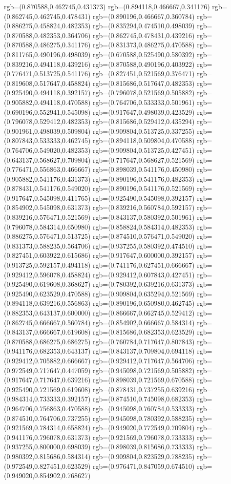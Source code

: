{{rgb=(0.870588,0.462745,0.431373)
rgb=(0.894118,0.466667,0.341176)
rgb=(0.862745,0.462745,0.478431)
rgb=(0.890196,0.466667,0.360784)
rgb=(0.886275,0.458824,0.482353)
rgb=(0.835294,0.474510,0.498039)
rgb=(0.870588,0.482353,0.364706)
rgb=(0.862745,0.478431,0.439216)
rgb=(0.870588,0.486275,0.341176)
rgb=(0.831373,0.486275,0.470588)
rgb=(0.811765,0.490196,0.498039)
rgb=(0.670588,0.525490,0.580392)
rgb=(0.839216,0.494118,0.439216)
rgb=(0.870588,0.490196,0.403922)
rgb=(0.776471,0.513725,0.541176)
rgb=(0.827451,0.521569,0.376471)
rgb=(0.819608,0.517647,0.458824)
rgb=(0.815686,0.517647,0.482353)
rgb=(0.925490,0.494118,0.392157)
rgb=(0.796078,0.521569,0.505882)
rgb=(0.905882,0.494118,0.470588)
rgb=(0.764706,0.533333,0.501961)
rgb=(0.690196,0.552941,0.545098)
rgb=(0.917647,0.498039,0.423529)
rgb=(0.796078,0.529412,0.482353)
rgb=(0.815686,0.529412,0.435294)
rgb=(0.901961,0.498039,0.509804)
rgb=(0.909804,0.513725,0.337255)
rgb=(0.807843,0.533333,0.462745)
rgb=(0.894118,0.509804,0.470588)
rgb=(0.764706,0.549020,0.482353)
rgb=(0.909804,0.513725,0.427451)
rgb=(0.643137,0.568627,0.709804)
rgb=(0.717647,0.568627,0.521569)
rgb=(0.776471,0.556863,0.466667)
rgb=(0.898039,0.541176,0.450980)
rgb=(0.905882,0.541176,0.431373)
rgb=(0.890196,0.541176,0.482353)
rgb=(0.878431,0.541176,0.549020)
rgb=(0.890196,0.541176,0.521569)
rgb=(0.917647,0.545098,0.411765)
rgb=(0.925490,0.545098,0.392157)
rgb=(0.854902,0.545098,0.631373)
rgb=(0.839216,0.560784,0.592157)
rgb=(0.839216,0.576471,0.521569)
rgb=(0.843137,0.580392,0.501961)
rgb=(0.796078,0.584314,0.650980)
rgb=(0.858824,0.584314,0.482353)
rgb=(0.886275,0.576471,0.513725)
rgb=(0.874510,0.576471,0.549020)
rgb=(0.831373,0.588235,0.564706)
rgb=(0.937255,0.580392,0.474510)
rgb=(0.827451,0.603922,0.615686)
rgb=(0.917647,0.600000,0.392157)
rgb=(0.913725,0.592157,0.494118)
rgb=(0.741176,0.627451,0.666667)
rgb=(0.929412,0.596078,0.458824)
rgb=(0.929412,0.607843,0.427451)
rgb=(0.925490,0.619608,0.368627)
rgb=(0.780392,0.639216,0.631373)
rgb=(0.925490,0.623529,0.470588)
rgb=(0.909804,0.635294,0.521569)
rgb=(0.894118,0.639216,0.556863)
rgb=(0.890196,0.650980,0.462745)
rgb=(0.882353,0.643137,0.600000)
rgb=(0.866667,0.662745,0.529412)
rgb=(0.862745,0.666667,0.560784)
rgb=(0.854902,0.666667,0.584314)
rgb=(0.843137,0.666667,0.619608)
rgb=(0.815686,0.682353,0.623529)
rgb=(0.870588,0.686275,0.686275)
rgb=(0.760784,0.717647,0.807843)
rgb=(0.941176,0.682353,0.643137)
rgb=(0.843137,0.709804,0.694118)
rgb=(0.929412,0.705882,0.666667)
rgb=(0.929412,0.717647,0.564706)
rgb=(0.972549,0.717647,0.447059)
rgb=(0.945098,0.721569,0.505882)
rgb=(0.917647,0.717647,0.639216)
rgb=(0.898039,0.721569,0.670588)
rgb=(0.925490,0.721569,0.619608)
rgb=(0.878431,0.737255,0.639216)
rgb=(0.984314,0.733333,0.392157)
rgb=(0.874510,0.745098,0.682353)
rgb=(0.964706,0.756863,0.470588)
rgb=(0.945098,0.760784,0.533333)
rgb=(0.874510,0.764706,0.737255)
rgb=(0.945098,0.780392,0.588235)
rgb=(0.921569,0.784314,0.658824)
rgb=(0.949020,0.772549,0.709804)
rgb=(0.941176,0.796078,0.631373)
rgb=(0.921569,0.796078,0.733333)
rgb=(0.937255,0.800000,0.698039)
rgb=(0.898039,0.815686,0.733333)
rgb=(0.980392,0.815686,0.584314)
rgb=(0.909804,0.823529,0.788235)
rgb=(0.972549,0.827451,0.623529)
rgb=(0.976471,0.847059,0.674510)
rgb=(0.949020,0.854902,0.768627)
}}
